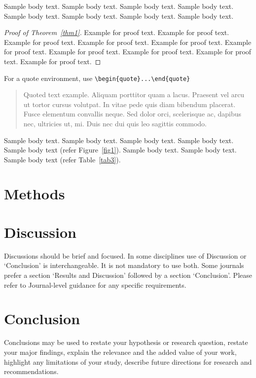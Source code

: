 \documentclass[sn-mathphys]{sn-jnl}%
\theoremstyle{thmstyleone}%
\theoremstyle{thmstyletwo}%
\theoremstyle{thmstylethree}%
\begin{document}
Sample body text. Sample body text. Sample body text. Sample body text. Sample body text. Sample body text. Sample body text. Sample body text.

\begin{proof}[Proof of Theorem~{\upshape\ref{thm1}}]
Example for proof text. Example for proof text. Example for proof text. Example for proof text. Example for proof text. Example for proof text. Example for proof text. Example for proof text. Example for proof text. Example for proof text. 
\end{proof}

\noindent
For a quote environment, use \verb+\begin{quote}...\end{quote}+
\begin{quote}
Quoted text example. Aliquam porttitor quam a lacus. Praesent vel arcu ut tortor cursus volutpat. In vitae pede quis diam bibendum placerat. Fusce elementum
convallis neque. Sed dolor orci, scelerisque ac, dapibus nec, ultricies ut, mi. Duis nec dui quis leo sagittis commodo.
\end{quote}

Sample body text. Sample body text. Sample body text. Sample body text. Sample body text (refer Figure~\ref{fig1}). Sample body text. Sample body text. Sample body text (refer Table~\ref{tab3}). 

\section{Methods}\label{sec11}



\section{Discussion}\label{sec12}

Discussions should be brief and focused. In some disciplines use of Discussion or `Conclusion' is interchangeable. It is not mandatory to use both. Some journals prefer a section `Results and Discussion' followed by a section `Conclusion'. Please refer to Journal-level guidance for any specific requirements. 

\section{Conclusion}\label{sec13}

Conclusions may be used to restate your hypothesis or research question, restate your major findings, explain the relevance and the added value of your work, highlight any limitations of your study, describe future directions for research and recommendations. 
\end{document}

